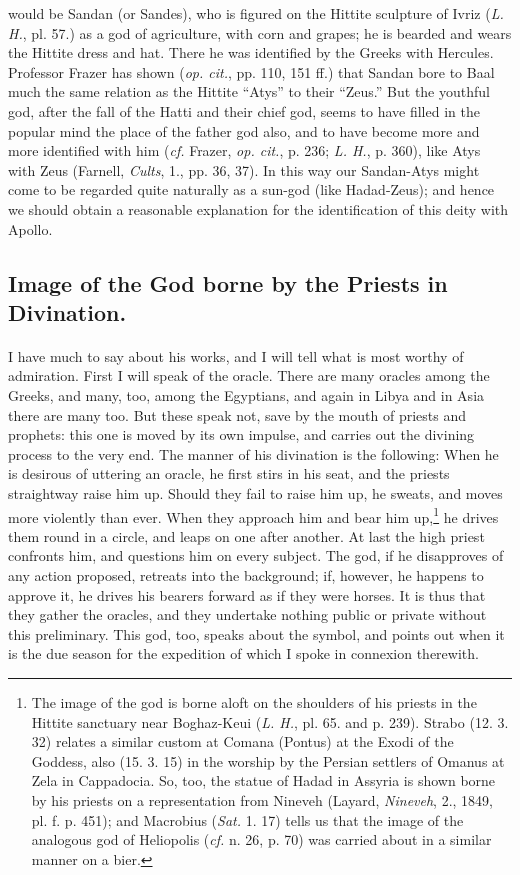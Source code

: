 \documentclass[a4paper, 11pt, oneside, polutonikogreek, english]{article}
\begin{document}
{would be Sandan (or Sandes), who is figured on the Hittite sculpture of Ivriz (\emph{L. H.}, pl. 57.) as a god of agriculture, with corn and grapes; he is bearded and wears the Hittite dress and hat. There he was identified by the Greeks with Hercules. Professor Frazer has shown (\emph{op. cit.}, pp. 110, 151 ff.) that Sandan bore to Baal much the same relation as the Hittite ``Atys'' to their ``Zeus.'' But the youthful god, after the fall of the Hatti and their chief god, seems to have filled in the popular mind the place of the father god also, and to have become more and more identified with him (\emph{cf.} Frazer, \emph{op. cit.}, p. 236; \emph{L. H.}, p. 360), like Atys with Zeus (Farnell, \emph{Cults}, 1., pp. 36, 37). In this way our Sandan-Atys might come to be regarded quite naturally as a sun-god (like Hadad-Zeus); and hence we should obtain a reasonable explanation for the identification of this deity with Apollo.}

\subsection{Image of the God borne by the Priests in Divination.}
\paragraph{}
I have much to say about his works, and I will tell what is most worthy of admiration. First I will speak of the oracle. There are many oracles among the Greeks, and many, too, among the Egyptians, and again in Libya and in Asia there are many too. But these speak not, save by the mouth of priests and prophets: this one is moved by its own impulse, and carries out the divining process to the very end. The manner of his divination is the following: When he is desirous of uttering an oracle, he first stirs in his seat, and the priests straightway raise him up. Should they fail to raise him up, he sweats, and moves more violently than ever. When they approach him and bear him up,\footnote{The image of the god is borne aloft on the shoulders of his priests in the Hittite sanctuary near Boghaz-Keui (\emph{L. H.}, pl. 65. and p. 239). Strabo (12. 3. 32) relates a similar custom at Comana (Pontus) at the Exodi of the Goddess, also (15. 3. 15) in the worship by the Persian settlers of Omanus at Zela in Cappadocia. So, too, the statue of Hadad in Assyria is shown borne by his priests on a representation from Nineveh (Layard, \emph{Nineveh}, 2., 1849, pl. f. p. 451); and Macrobius (\emph{Sat.} 1. 17) tells us that the image of the analogous god of Heliopolis (\emph{cf.} n. 26, p. 70) was carried about in a similar manner on a bier.} he drives them round in a circle, and leaps on one after another. At last the high priest confronts him, and questions him on every subject. The god, if he disapproves of any action proposed, retreats into the background; if, however, he happens to approve it, he drives his bearers forward as if they were horses. It is thus that they gather the oracles, and they undertake nothing public or private without this preliminary. This god, too, speaks about the symbol, and points out when it is the due season for the expedition of which I spoke in connexion therewith.
\end{document}
